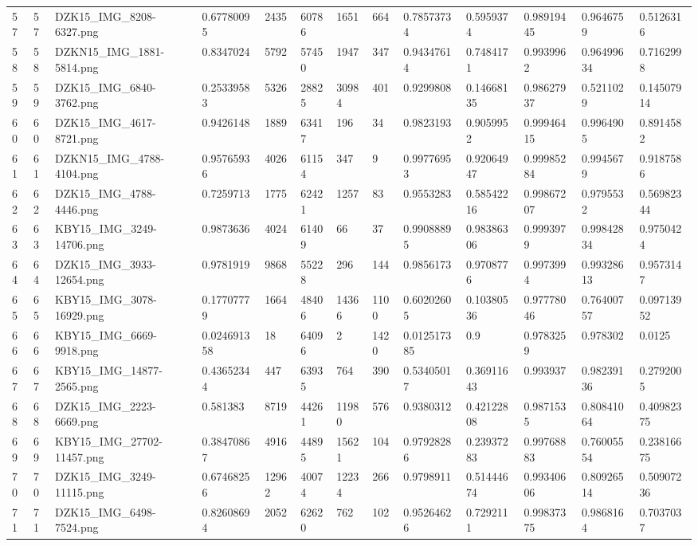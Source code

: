 \documentclass[11pt, a4paper, twoside]{report}
\begin{document}
\begin{longtable}[c]{@{}lllllllllllll@{}}
57 & 57 & DZK15\_IMG\_8208-6327.png & 0.67780095 & 2435 & 60786 & 1651 & 664 & 0.78573734 & 0.5959374 & 0.98919445 & 0.9646759 & 0.5126316 \\
58 & 58 & DZKN15\_IMG\_1881-5814.png & 0.8347024 & 5792 & 57450 & 1947 & 347 & 0.94347614 & 0.7484171 & 0.9939962 & 0.96499634 & 0.7162998 \\
59 & 59 & DZK15\_IMG\_6840-3762.png & 0.25339583 & 5326 & 28825 & 30984 & 401 & 0.9299808 & 0.14668135 & 0.98627937 & 0.5211029 & 0.14507914 \\
60 & 60 & DZK15\_IMG\_4617-8721.png & 0.9426148 & 1889 & 63417 & 196 & 34 & 0.9823193 & 0.9059952 & 0.99946415 & 0.9964905 & 0.8914582 \\
61 & 61 & DZKN15\_IMG\_4788-4104.png & 0.95765936 & 4026 & 61154 & 347 & 9 & 0.99776953 & 0.92064947 & 0.99985284 & 0.9945679 & 0.9187586 \\
62 & 62 & DZK15\_IMG\_4788-4446.png & 0.7259713 & 1775 & 62421 & 1257 & 83 & 0.9553283 & 0.58542216 & 0.99867207 & 0.9795532 & 0.56982344 \\
63 & 63 & KBY15\_IMG\_3249-14706.png & 0.9873636 & 4024 & 61409 & 66 & 37 & 0.99088895 & 0.98386306 & 0.9993979 & 0.99842834 & 0.9750424 \\
64 & 64 & DZK15\_IMG\_3933-12654.png & 0.9781919 & 9868 & 55228 & 296 & 144 & 0.9856173 & 0.9708776 & 0.9973994 & 0.99328613 & 0.9573147 \\
65 & 65 & KBY15\_IMG\_3078-16929.png & 0.17707779 & 1664 & 48406 & 14366 & 1100 & 0.60202605 & 0.10380536 & 0.97778046 & 0.76400757 & 0.09713952 \\
66 & 66 & KBY15\_IMG\_6669-9918.png & 0.024691358 & 18 & 64096 & 2 & 1420 & 0.012517385 & 0.9 & 0.9783259 & 0.978302 & 0.0125 \\
67 & 67 & KBY15\_IMG\_14877-2565.png & 0.43652344 & 447 & 63935 & 764 & 390 & 0.53405017 & 0.36911643 & 0.993937 & 0.98239136 & 0.2792005 \\
68 & 68 & DZK15\_IMG\_2223-6669.png & 0.581383 & 8719 & 44261 & 11980 & 576 & 0.9380312 & 0.42122808 & 0.9871535 & 0.80841064 & 0.40982375 \\
69 & 69 & KBY15\_IMG\_27702-11457.png & 0.38470867 & 4916 & 44895 & 15621 & 104 & 0.97928286 & 0.23937283 & 0.99768883 & 0.76005554 & 0.23816675 \\
70 & 70 & DZK15\_IMG\_3249-11115.png & 0.67468256 & 12962 & 40074 & 12234 & 266 & 0.9798911 & 0.51444674 & 0.99340606 & 0.80926514 & 0.50907236 \\
71 & 71 & DZK15\_IMG\_6498-7524.png & 0.82608694 & 2052 & 62620 & 762 & 102 & 0.95264626 & 0.7292111 & 0.99837375 & 0.9868164 & 0.7037037 \\

\end{longtable}
\end{document}
